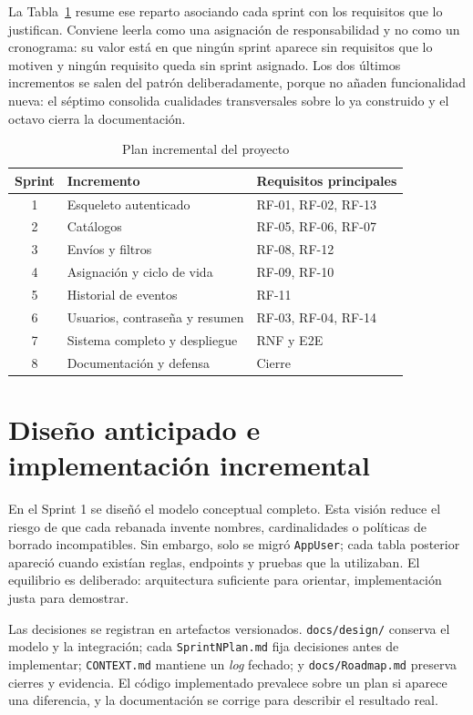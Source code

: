 La Tabla~\ref{tab:plan-incremental} resume ese reparto asociando cada sprint con los requisitos que lo justifican. Conviene leerla como una asignación de responsabilidad y no como un cronograma: su valor está en que ningún sprint aparece sin requisitos que lo motiven y ningún requisito queda sin sprint asignado. Los dos últimos incrementos se salen del patrón deliberadamente, porque no añaden funcionalidad nueva: el séptimo consolida cualidades transversales sobre lo ya construido y el octavo cierra la documentación.

\begin{table}[htbp]
\centering
\caption{Plan incremental del proyecto}
\label{tab:plan-incremental}
\begin{tabular}{cll}
\hline
Sprint & Incremento & Requisitos principales \\
\hline
1 & Esqueleto autenticado & RF-01, RF-02, RF-13 \\
2 & Catálogos & RF-05, RF-06, RF-07 \\
3 & Envíos y filtros & RF-08, RF-12 \\
4 & Asignación y ciclo de vida & RF-09, RF-10 \\
5 & Historial de eventos & RF-11 \\
6 & Usuarios, contraseña y resumen & RF-03, RF-04, RF-14 \\
7 & Sistema completo y despliegue & RNF y E2E \\
8 & Documentación y defensa & Cierre \\
\hline
\end{tabular}
\end{table}

\section{Diseño anticipado e implementación incremental}

En el Sprint 1 se diseñó el modelo conceptual completo. Esta visión reduce el riesgo de que cada rebanada invente nombres, cardinalidades o políticas de borrado incompatibles. Sin embargo, solo se migró \texttt{AppUser}; cada tabla posterior apareció cuando existían reglas, endpoints y pruebas que la utilizaban. El equilibrio es deliberado: arquitectura suficiente para orientar, implementación justa para demostrar.

Las decisiones se registran en artefactos versionados. \texttt{docs/design/} conserva el modelo y la integración; cada \texttt{SprintNPlan.md} fija decisiones antes de implementar; \texttt{CONTEXT.md} mantiene un \emph{log} fechado; y \texttt{docs/Roadmap.md} preserva cierres y evidencia. El código implementado prevalece sobre un plan si aparece una diferencia, y la documentación se corrige para describir el resultado real.

